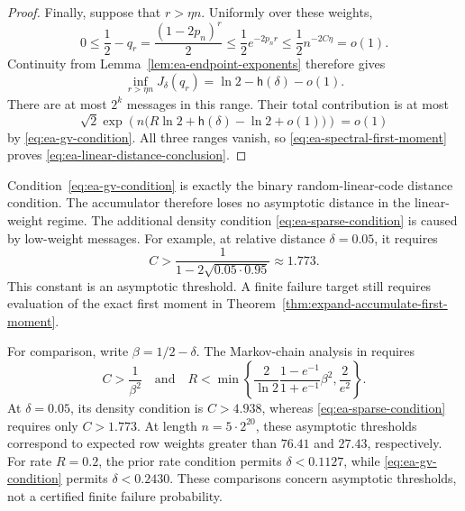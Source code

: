 \begin{proof}
Finally, suppose that $r>\eta n$.  Uniformly over these weights,
\begin{equation}
 0\leq\frac12-q_r
 =\frac{(1-2p_n)^r}{2}
 \leq\frac12e^{-2p_nr}
 \leq\frac12n^{-2C\eta}=o(1).
 \label{eq:ea-dense-q}
\end{equation}
Continuity from Lemma~\ref{lem:ea-endpoint-exponents} therefore gives
\begin{equation}
 \inf_{r>\eta n}J_\delta(q_r)
 =\ln 2-\mathsf{h}(\delta)-o(1).
 \label{eq:ea-dense-rate}
\end{equation}
There are at most $2^k$ messages in this range.  Their total contribution is
at most
\begin{equation}
 \sqrt{2}\exp\left(
 n\bigl(R\ln2+\mathsf{h}(\delta)-\ln2+o(1)\bigr)
 \right)=o(1)
 \label{eq:ea-dense-tail-sum}
\end{equation}
by \eqref{eq:ea-gv-condition}.  All three ranges vanish, so
\eqref{eq:ea-spectral-first-moment} proves
\eqref{eq:ea-linear-distance-conclusion}.
\end{proof}

Condition~\eqref{eq:ea-gv-condition} is exactly the binary random-linear-code
distance condition.  The accumulator therefore loses no asymptotic distance
in the linear-weight regime.  The additional density condition
\eqref{eq:ea-sparse-condition} is caused by low-weight messages.  For example,
at relative distance $\delta=0.05$, it requires
\begin{equation}
 C>\frac{1}{1-2\sqrt{0.05\cdot0.95}}\approx1.773.
 \label{eq:ea-delta-five-density}
\end{equation}
This constant is an asymptotic threshold.  A finite failure target still
requires evaluation of the exact first moment in
Theorem~\ref{thm:expand-accumulate-first-moment}.

For comparison, write $\beta=1/2-\delta$.  The Markov-chain analysis in
\cite[Theorem~3.10]{EA} requires
\begin{equation}
 C>\frac{1}{\beta^2}
 \quad\text{and}\quad
 R<\min\left\{
 \frac{2}{\ln2}\frac{1-e^{-1}}{1+e^{-1}}\beta^2,
 \frac{2}{e^2}
 \right\}.
 \label{eq:ea-prior-conditions}
\end{equation}
At $\delta=0.05$, its density condition is $C>4.938$, whereas
\eqref{eq:ea-sparse-condition} requires only $C>1.773$.  At length
$n=5\cdot2^{20}$, these asymptotic thresholds correspond to expected row
weights greater than $76.41$ and $27.43$, respectively.  For rate $R=0.2$,
the prior rate condition permits $\delta<0.1127$, while
\eqref{eq:ea-gv-condition} permits $\delta<0.2430$.  These comparisons concern
asymptotic thresholds, not a certified finite failure probability.

